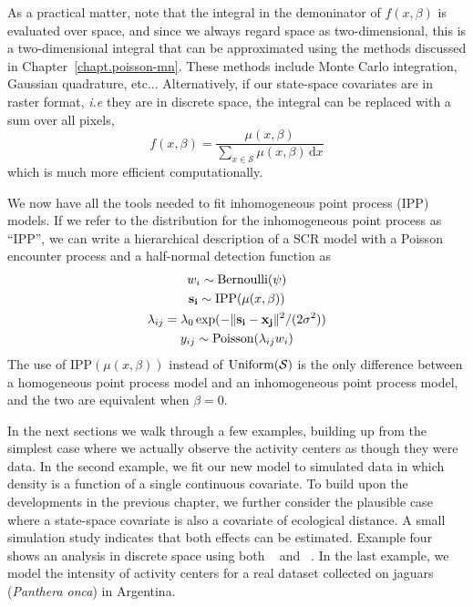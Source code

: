 As a practical matter, note that the integral in the
demoninator of $f(x, \beta)$ is evaluated over space, and since we always regard
space as two-dimensional, this is a two-dimensional integral that can
be approximated using the methods discussed in
Chapter~\ref{chapt.poisson-mn}. These methods include
Monte Carlo integration, Gaussian quadrature, etc... Alternatively, if
our state-space covariates are in raster format, \emph{i.e} they are
in discrete space, the integral can be replaced with a sum over
all pixels,
\begin{equation}
f(x, \beta) = \frac{\mu(x, \beta)}{\sum_{x \in \mathcal{S}} \mu(x, \beta)\, \mathrm{d}x}
\label{eq.pdf.dipp.d}
\end{equation}
which is much more efficient computationally.

We now have all the tools needed to fit inhomogeneous point process
(IPP) models. If we refer to the distribution for the
inhomogeneous point process as ``IPP'', we can write a
hierarchical description of a SCR model with a Poisson encounter process and
a half-normal detection function as
\begin{gather*}
w_i \sim \mbox{Bernoulli}(\psi) \\
{\bf s_i} \sim \mbox{IPP}(\mu(x,\beta)) \\
\lambda_{ij} = \lambda_0 \exp(-\|{\bf s_i} - {\bf x_{j}}\|^2/(2\sigma^2)) \\
y_{ij} \sim \mbox{Poisson}(\lambda_{ij} w_i)
\end{gather*}
The use of $\mbox{IPP}(\mu(x, \beta))$ instead of
$\mbox{Uniform}(\cal{S})$ is the only difference between a homogeneous
point process model and an inhomogeneous point process model, and the
two are equivalent when $\beta=0$.

In the next sections we walk through a few examples, building up from
the simplest case where we actually observe the activity centers as
though they were data. In the second example, we fit our new model to simulated
data in which density is a function of a single continuous
covariate. To build upon the developments in the previous chapter, we
further consider the plausible case where a state-space covariate is also a
covariate of ecological distance. A small simulation study indicates
that both effects can be estimated. Example four shows an analysis in discrete space using
both \secr~\citep{efford:2011} and \jags~\citep{plummer:2003}. In the
last example, we model the intensity of
activity centers for a real dataset collected on jaguars
(\emph{Panthera onca}) in Argentina.

